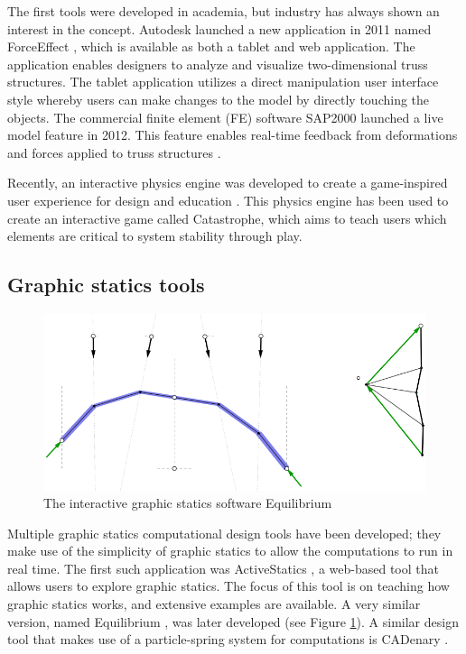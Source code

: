 The first tools were developed in academia, but industry has always shown an interest in the concept. Autodesk launched a new application in 2011 named ForceEffect \cite{Autodesk2011}, which is available as both a tablet and web application. The application enables designers to analyze and visualize two-dimensional truss structures. The tablet application utilizes a direct manipulation user interface style whereby users can make changes to the model by directly touching the objects. The commercial finite element (FE) software SAP2000 \cite{sap2000} launched a live model feature in 2012. This feature enables real-time feedback from deformations and forces applied to truss structures \cite{clune2012object}.

Recently, an interactive physics engine was developed to create a game-inspired user experience for design and education \cite{Senatore2015}. This physics engine has been used to create an interactive game called Catastrophe, which aims to teach users which elements are critical to system stability through play.

\subsection{Graphic statics tools}

\begin{figure}
  \includegraphics[width=330pt]{graphics/equilibrium.png}
  \caption{The interactive graphic statics software Equilibrium \cite{Block}}
  \label{fig:equilibrium}
\end{figure}

Multiple graphic statics computational design tools have been developed; they make use of the simplicity of graphic statics to allow the computations to run in real time. The first such application was ActiveStatics \cite{ActiveStatics}, a web-based tool that allows users to explore graphic statics. The focus of this tool is on teaching how graphic statics works, and extensive examples are available. A very similar version, named Equilibrium \cite{Block}, was later developed (see Figure \ref{fig:equilibrium}). A similar design tool that makes use of a particle-spring system for computations is CADenary \cite{CADenary}.

